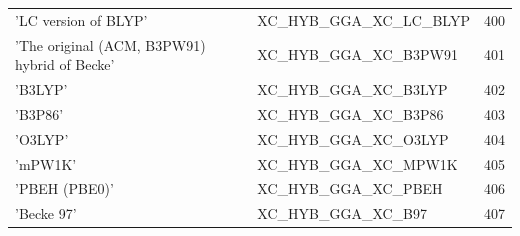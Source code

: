 \documentclass[final,12pt]{article}
\begin{document}
{{{{{{\begin{table}[!h]
\begin{center}
\begin{tabular}{llr}
  'LC version of BLYP' & XC\_HYB\_GGA\_XC\_LC\_BLYP  &400\\
  'The original (ACM, B3PW91) hybrid of Becke' & XC\_HYB\_GGA\_XC\_B3PW91  &401\\
  'B3LYP' & XC\_HYB\_GGA\_XC\_B3LYP  &402\\
  'B3P86' & XC\_HYB\_GGA\_XC\_B3P86  &403\\
  'O3LYP' & XC\_HYB\_GGA\_XC\_O3LYP  &404\\
  'mPW1K' & XC\_HYB\_GGA\_XC\_MPW1K  &405\\
  'PBEH (PBE0)' & XC\_HYB\_GGA\_XC\_PBEH  &406\\
  'Becke 97' & XC\_HYB\_GGA\_XC\_B97  &407\\
\hline
\hline
\end{tabular}
\end{center}
\end{table}

}}}}}}
\end{document}
